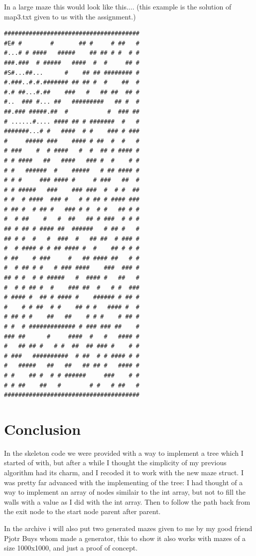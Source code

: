 \documentclass[pdftex,12pt,a4paper]{article}
\begin{document}
In a large maze this would look like this.... (this example is the solution of map3.txt given to us with the assignment.)
\begin{verbatim}
######################################
#E# #        #       ## #     # ##   #
#...# # ####   #####    ## ## # #  # #
###.###  # #####   ####  #  #     ## #
#S#...##...      #    ## ## ######## #
#.###..#.#.####### ## ## #  #    ##  #
#.# ##...#.##    ###   #   ## ##  ## #
#..  ### #... ##   #########   ## #  #
##.### #####.##  #           #  ### ##
# ......#.... #### ## # #######  #   #
#######...# #   ####  # #    ### # ###
#     ##### ###    #### # ##  #  #   #
# ###    #  # ####   #  #  ## # #### #
# # ####   ##   ####   ### #  #    # #
# #   ######  #    #####   # ## #### #
# # #     ### #### #     # ###   ##  #
# # #####   ###    ### ###  #  # #  ##
# #  # ####  ### #   # # ## # #### ###
# ## #  # ## #   ### # #  # #   ## # #
#  # ##    #   #  ##   ## # ###  # # #
## # ## # #### ##  ######   # ## #   #
## # #  #   #  ###  #   ## ##  # ### #
#  # #### # # ## #### #  #    ## # # #
# ##    # ###     #   ## #### ##   # #
#  # ## # #   # ### ####    ###  ### #
## # #  # # #####   #  #### #   ##   #
#  # # ## #  #    ### ##  #   # #  ###
# #### #  ## # #### #    ###### # ## #
#    # # ##  # #    ## # #   #### #  #
# ## # #    ##   ##    # # #    # ## #
# #  # ############# # ### ### ##    #
### ##      #     ####  #   #   #### #
#   ## ## #   # #  ##  ## ### #    # #
# ###   ##########  # ##  # # #### # #
#   #####   ##   ##   ## ## #   #### #
# #    ## #  # # ######     ###    # #
# # ##    ##   #        # #   # ##   #
######################################
\end{verbatim}
\section{Conclusion}
In the skeleton code we were provided with a way to implement a tree which I started of with, but after a while I thought the simplicity of my previous algorithm had its charm, and I recoded it to work with the new maze struct.
I was pretty far advanced with the implementing of the tree:
I had thought of a way to implement an array of nodes similair to the int array, but not to fill the walls with a value as I did with the int array. Then to follow the path back from the exit node to the start node parent after parent.

In the archive i will also put two generated mazes given to me by my good friend Pjotr Buys whom made a generator, this to show it also works with mazes of a size 1000x1000, and just a proof of concept.
\end{document}
